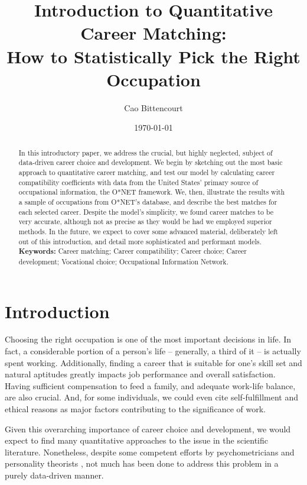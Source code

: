 \documentclass{article}
\title{
    Introduction to Quantitative Career Matching:\\
    How to Statistically Pick the Right Occupation
}
\author{Cao Bittencourt}
\date{\today}
\begin{document}
\maketitle

\newpage

\begin{abstract}
    \noindent
    In this introductory paper, we address the crucial, but highly neglected, subject of data-driven career choice and development. We begin by sketching out the most basic approach to quantitative career matching, and test our model by calculating career compatibility coefficients with data from the United States' primary source of occupational information, the O*NET framework. We, then, illustrate the results with a sample of occupations from O*NET's database, and describe the best matches for each selected career. Despite the model's simplicity, we found career matches to be very accurate, although not as precise as they would be had we employed superior methods. In the future, we expect to cover some advanced material, deliberately left out of this introduction, and detail more sophisticated and performant models.\\

    \noindent
    \textbf{Keywords:} Career matching; Career compatibility; Career choice; Career development; Vocational choice; Occupational Information Network.
\end{abstract}

\newpage
\tableofcontents

\newpage
\listoftables

\newpage
\section{Introduction}
Choosing the right occupation is one of the most important decisions in life.
In fact, a considerable portion of a person's life -- generally, a third of it
-- is actually spent working. Additionally, finding a career that is suitable
for one's skill set and natural aptitudes greatly impacts job performance and
overall satisfaction. Having sufficient compensation to feed a family, and
adequate work-life balance, are also crucial. And, for some individuals, we
could even cite self-fulfillment and ethical reasons as major factors
contributing to the significance of work.

Given this overarching importance of career choice and development, we would
expect to find many quantitative approaches to the issue in the scientific
literature. Nonetheless, despite some competent efforts by psychometricians and
personality theorists
\parencites[e.g.][]{holland1959theory, holland1997making}{schein1978careerdynamics,
    schein1993careeranchors}, not much has been done to address this problem in a
purely data-driven manner.
\end{document}
